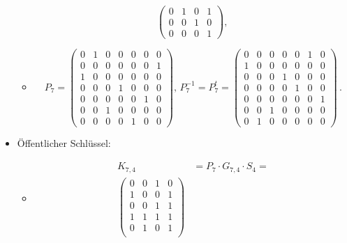 \begin{itemize}
\begin{itemize}
\[\begin{pmatrix}
                0 & 1 & 0 & 1\\
                0 & 0 & 1 & 0\\
                0 & 0 & 0 & 1
            \end{pmatrix},\,
        \]
        \item[]
        \[
            P_7=
            \begin{pmatrix}
                0 & 1 & 0 & 0 & 0 & 0 & 0\\
                0 & 0 & 0 & 0 & 0 & 0 & 1\\
                1 & 0 & 0 & 0 & 0 & 0 & 0\\
                0 & 0 & 0 & 1 & 0 & 0 & 0\\
                0 & 0 & 0 & 0 & 0 & 1 & 0\\
                0 & 0 & 1 & 0 & 0 & 0 & 0\\
                0 & 0 & 0 & 0 & 1 & 0 & 0
            \end{pmatrix}
        ,\,
            P_7^{-1}=P_7^t=
            \begin{pmatrix}
                0 & 0 & 0 & 0 & 0 & 1 & 0\\
                1 & 0 & 0 & 0 & 0 & 0 & 0\\
                0 & 0 & 0 & 1 & 0 & 0 & 0\\
                0 & 0 & 0 & 0 & 1 & 0 & 0\\
                0 & 0 & 0 & 0 & 0 & 0 & 1\\
                0 & 0 & 1 & 0 & 0 & 0 & 0\\
                0 & 1 & 0 & 0 & 0 & 0 & 0
            \end{pmatrix}
            \,.
        \]
    \end{itemize}
    \item Öffentlicher Schlüssel:
    \begin{itemize}
        \item[]
        \begin{align*}
            K_{7,4}&=P_{7}\cdot G_{7,4}\cdot S_{4}=\\
            \begin{pmatrix} %
                0 & 0 & 1 & 0\\
                1 & 0 & 0 & 1\\
                0 & 0 & 1 & 1\\
                1 & 1 & 1 & 1\\
                0 & 1 & 0 & 1\\

\end{pmatrix}
\end{align*}
\end{itemize}
\end{itemize}
